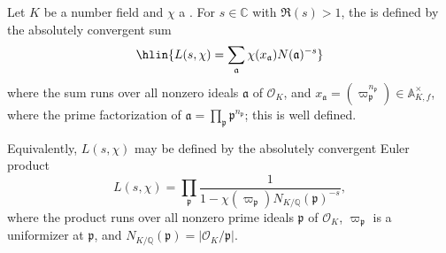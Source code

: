 \begin{definition} \label{definition:hecke_L_function_of_a_hecke_character_of_a_number_field}
Let $K$ be a number field and $\chi$ a . For $s\in\mathbb{C}$ with $\Re(s) > 1$, the  is defined by the absolutely convergent sum
$$ \hlin{L(s, \chi) = \sum_{\mathfrak{a}} \chi(x_\mathfrak{a})N(\mathfrak{a})^{-s}} $$
where the sum runs over all nonzero ideals $\mathfrak{a}$ of $\mathcal{O}_K$, and $x_\mathfrak{a} = \left(\varpi_\mathfrak{p}^{n_\mathfrak{p}} \right) \in \mathbb{A}_{K,f}^\times$, where the prime factorization of $\mathfrak{a} = \prod_{\mathfrak{p}} \mathfrak{p}^{n_\mathfrak{p}}$; this is well defined. 

Equivalently, $L(s,\chi)$ may be defined by the absolutely convergent Euler product
$$ L(s, \chi) = \prod_{\mathfrak{p}} \frac{1}{1 - \chi(\varpi_{\mathfrak{p}}) N_{K/\mathbb{Q}}(\mathfrak{p})^{-s}}, $$
where the product runs over all nonzero prime ideals $\mathfrak{p}$ of $\mathcal{O}_K$, $\varpi_{\mathfrak{p}}$ is a uniformizer at $\mathfrak{p}$, and $N_{K/\mathbb{Q}}(\mathfrak{p}) = |\mathcal{O}_K / \mathfrak{p}|$.
\end{definition}